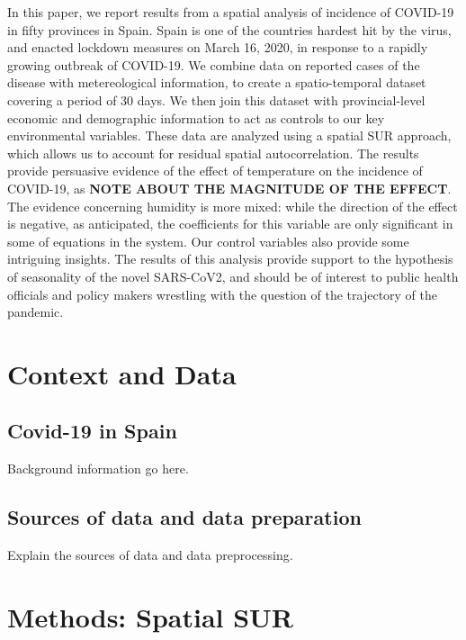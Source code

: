 \documentclass[]{elsarticle} %
\begin{document}
In this paper, we report results from a spatial analysis of incidence of
COVID-19 in fifty provinces in Spain. Spain is one of the countries
hardest hit by the virus, and enacted lockdown measures on March 16,
2020, in response to a rapidly growing outbreak of COVID-19. We combine
data on reported cases of the disease with metereological information,
to create a spatio-temporal dataset covering a period of 30 days. We
then join this dataset with provincial-level economic and demographic
information to act as controls to our key environmental variables. These
data are analyzed using a spatial SUR approach, which allows us to
account for residual spatial autocorrelation. The results provide
persuasive evidence of the effect of temperature on the incidence of
COVID-19, as \textbf{NOTE ABOUT THE MAGNITUDE OF THE EFFECT}. The
evidence concerning humidity is more mixed: while the direction of the
effect is negative, as anticipated, the coefficients for this variable
are only significant in some of equations in the system. Our control
variables also provide some intriguing insights. The results of this
analysis provide support to the hypothesis of seasonality of the novel
SARS-CoV2, and should be of interest to public health officials and
policy makers wrestling with the question of the trajectory of the
pandemic.

\hypertarget{context-and-data}{%
\section{Context and Data}\label{context-and-data}}

\hypertarget{covid-19-in-spain}{%
\subsection{Covid-19 in Spain}\label{covid-19-in-spain}}

Background information go here.

\hypertarget{sources-of-data-and-data-preparation}{%
\subsection{Sources of data and data
preparation}\label{sources-of-data-and-data-preparation}}

Explain the sources of data and data preprocessing.

\hypertarget{methods-spatial-sur}{%
\section{Methods: Spatial SUR}\label{methods-spatial-sur}}
\end{document}
